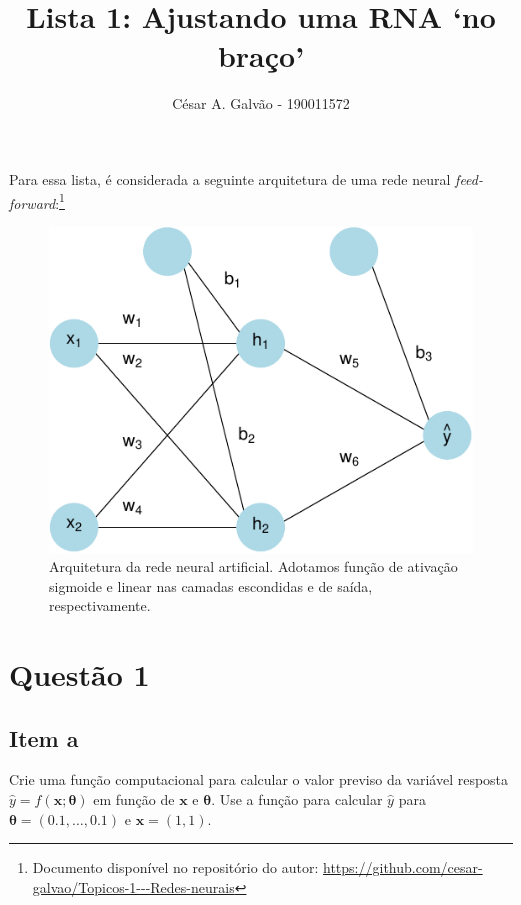 \documentclass[
  a4paperpaper,
]{article}
\title{Lista 1: Ajustando uma RNA `no braço'}
\author{César A. Galvão - 190011572}
\date{}
\begin{document}
\maketitle

Para essa lista, é considerada a seguinte arquitetura de uma rede neural
\emph{feed-forward}:\footnote{Documento disponível no repositório do
  autor: \url{https://github.com/cesar-galvao/Topicos-1---Redes-neurais}}

\begin{figure}[H]

{\centering \includegraphics{lista1-resolucao_files/figure-pdf/figf-arquitetura-rede-1.pdf}

}

\caption{Arquitetura da rede neural artificial. Adotamos função de
ativação sigmoide e linear nas camadas escondidas e de saída,
respectivamente.}

\end{figure}%

\section{Questão 1}\label{questuxe3o-1}

\subsection{Item a}\label{item-a}

Crie uma função computacional para calcular o valor previso da variável
resposta \(\hat{y} = f(\boldsymbol{x}; \boldsymbol{\theta})\) em função
de \(\boldsymbol{x}\) e \(\boldsymbol{\theta}\). Use a função para
calcular \(\hat{y}\) para \(\boldsymbol{\theta} = (0.1, \dots , 0.1)\) e
\(\boldsymbol{x} = (1, 1)\).
\end{document}
